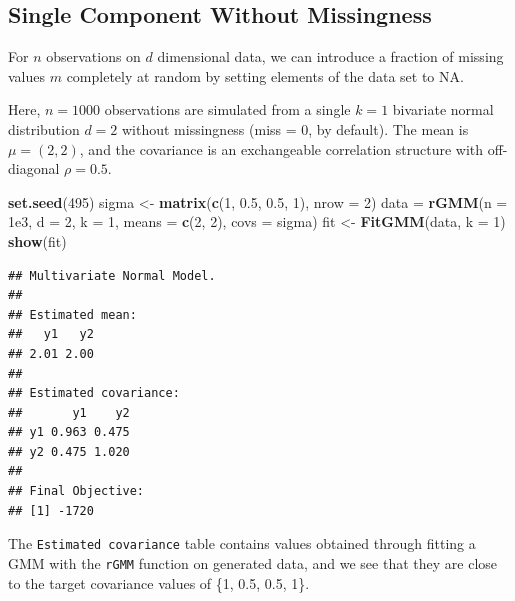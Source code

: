 \documentclass[12pt]{article}
\newenvironment{Shaded}{\begin{snugshade}}{\end{snugshade}}
\newcommand{\AttributeTok}[1]{\textcolor[rgb]{0.13,0.29,0.53}{#1}}
\newcommand{\DecValTok}[1]{\textcolor[rgb]{0.00,0.00,0.81}{#1}}
\newcommand{\FloatTok}[1]{\textcolor[rgb]{0.00,0.00,0.81}{#1}}
\newcommand{\FunctionTok}[1]{\textcolor[rgb]{0.13,0.29,0.53}{\textbf{#1}}}
\newcommand{\NormalTok}[1]{#1}
\newcommand{\OtherTok}[1]{\textcolor[rgb]{0.56,0.35,0.01}{#1}}
\begin{document}
\hypertarget{single-component-without-missingness}{%
\subsection{Single Component Without
Missingness}\label{single-component-without-missingness}}

For \(n\) observations on \(d\) dimensional data, we can introduce a
fraction of missing values \(m\) completely at random by setting
elements of the data set to NA.

Here, \(n = 1000\) observations are simulated from a single \(k = 1\)
bivariate normal distribution \(d = 2\) without missingness (miss = 0,
by default). The mean is \(\mu = (2, 2)\), and the covariance is an
exchangeable correlation structure with off-diagonal \(\rho = 0.5\).

\begin{Shaded}
\begin{Highlighting}[]
\FunctionTok{set.seed}\NormalTok{(}\DecValTok{495}\NormalTok{)}
\NormalTok{sigma }\OtherTok{\textless{}{-}} \FunctionTok{matrix}\NormalTok{(}\FunctionTok{c}\NormalTok{(}\DecValTok{1}\NormalTok{, }\FloatTok{0.5}\NormalTok{, }\FloatTok{0.5}\NormalTok{, }\DecValTok{1}\NormalTok{), }\AttributeTok{nrow =} \DecValTok{2}\NormalTok{)}
\NormalTok{data }\OtherTok{=} \FunctionTok{rGMM}\NormalTok{(}\AttributeTok{n =} \FloatTok{1e3}\NormalTok{, }\AttributeTok{d =} \DecValTok{2}\NormalTok{, }\AttributeTok{k =} \DecValTok{1}\NormalTok{, }\AttributeTok{means =} \FunctionTok{c}\NormalTok{(}\DecValTok{2}\NormalTok{, }\DecValTok{2}\NormalTok{), }\AttributeTok{covs =}\NormalTok{ sigma)}
\NormalTok{fit }\OtherTok{\textless{}{-}} \FunctionTok{FitGMM}\NormalTok{(data, }\AttributeTok{k =} \DecValTok{1}\NormalTok{)}
\FunctionTok{show}\NormalTok{(fit)}
\end{Highlighting}
\end{Shaded}

\begin{verbatim}
## Multivariate Normal Model. 
## 
## Estimated mean:
##   y1   y2 
## 2.01 2.00 
## 
## Estimated covariance:
##       y1    y2
## y1 0.963 0.475
## y2 0.475 1.020
## 
## Final Objective:
## [1] -1720
\end{verbatim}

The \texttt{Estimated\ covariance} table contains values obtained
through fitting a GMM with the \texttt{rGMM} function on generated data,
and we see that they are close to the target covariance values of \{1,
0.5, 0.5, 1\}.
\end{document}
